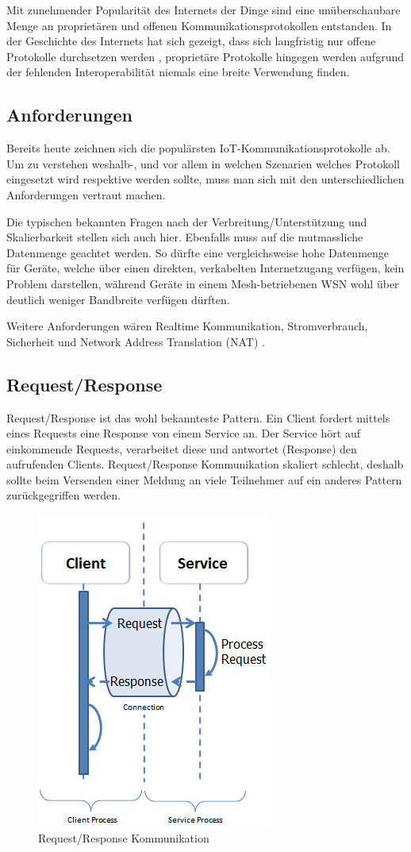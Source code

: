 Mit zunehmender Popularität des Internets der Dinge sind eine unüberschaubare Menge an proprietären und offenen Kommunikationsprotokollen entstanden. In der Geschichte des Internets hat sich gezeigt, dass sich langfristig nur offene Protokolle durchsetzen werden \cite{Obermaier14}, proprietäre Protokolle hingegen werden aufgrund der fehlenden Interoperabilität niemals eine breite Verwendung finden.
\subsection{Anforderungen}
Bereits heute zeichnen sich die populärsten IoT-Kommunikationsprotokolle ab. Um zu verstehen weshalb-, und vor allem in welchen Szenarien welches Protokoll eingesetzt wird respektive werden sollte, muss man sich mit den unterschiedlichen Anforderungen vertraut machen.

Die typischen bekannten Fragen nach der Verbreitung/Unterstützung und Skalierbarkeit stellen sich auch hier. Ebenfalls muss auf die mutmassliche Datenmenge geachtet werden. So dürfte eine vergleichsweise hohe Datenmenge für Geräte, welche über einen direkten, verkabelten Internetzugang verfügen, kein Problem darstellen, während Geräte in einem Mesh-betriebenen WSN wohl über deutlich weniger Bandbreite verfügen dürften.

Weitere Anforderungen wären Realtime Kommunikation, Stromverbrauch, Sicherheit und Network Address Translation (NAT) \cite{Obermaier15}.
\subsection{Request/Response}
Request/Response ist das wohl bekannteste Pattern. Ein Client fordert mittels eines Requests eine Response von einem Service an. Der Service hört auf einkommende Requests, verarbeitet diese und antwortet (Response) den aufrufenden Clients. Request/Response Kommunikation skaliert schlecht, deshalb sollte beim Versenden einer Meldung an viele Teilnehmer auf ein anderes Pattern zurückgegriffen werden. 
\begin{figure}[H]
\centering
\includegraphics[scale=0.8]{../02_Analyse/images/request-response.png}
\caption{Request/Response Kommunikation \cite{ReqRes}}
\end{figure}
